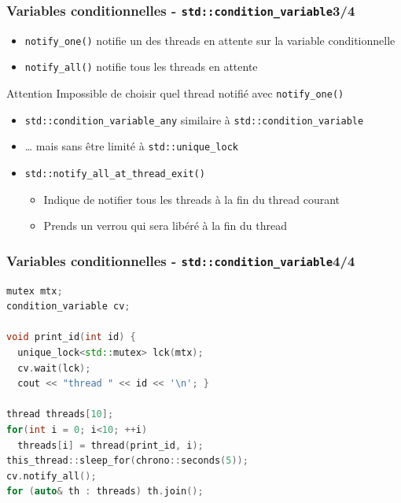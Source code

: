 \documentclass[C++.tex]{subfiles}
\begin{document}
\begin{frame}[fragile]
	\frametitle{Variables conditionnelles - \lstinline|std::condition_variable|\titlehfill{}3/4}
	\begin{itemize}
		\item \lstinline|notify_one()| notifie un des threads en attente sur la variable conditionnelle
		\item \lstinline|notify_all()| notifie tous les threads en attente
	\end{itemize}

	\begin{alertblock}{Attention}
		Impossible de choisir quel thread notifié avec \lstinline|notify_one()|
	\end{alertblock}

	\begin{itemize}
		\item \lstinline|std::condition_variable_any| similaire à \lstinline|std::condition_variable|
		\item \ldots{} mais sans être limité à \lstinline|std::unique_lock|
		\item \lstinline|std::notify_all_at_thread_exit()| 
		\begin{itemize}
			\item Indique de notifier tous les threads à la fin du thread courant
			\item Prends un verrou qui sera libéré à la fin du thread
		\end{itemize}
	\end{itemize}
\end{frame}

\begin{frame}[fragile]
	\frametitle{Variables conditionnelles - \lstinline|std::condition_variable|\titlehfill{}4/4}
	\begin{lstlisting}[language=C++]
mutex mtx;
condition_variable cv;

void print_id(int id) {
  unique_lock<std::mutex> lck(mtx);
  cv.wait(lck);
  cout << "thread " << id << '\n'; }

thread threads[10];
for(int i = 0; i<10; ++i)
  threads[i] = thread(print_id, i);
this_thread::sleep_for(chrono::seconds(5));
cv.notify_all();
for (auto& th : threads) th.join();\end{lstlisting}
\end{frame}
\end{document}
